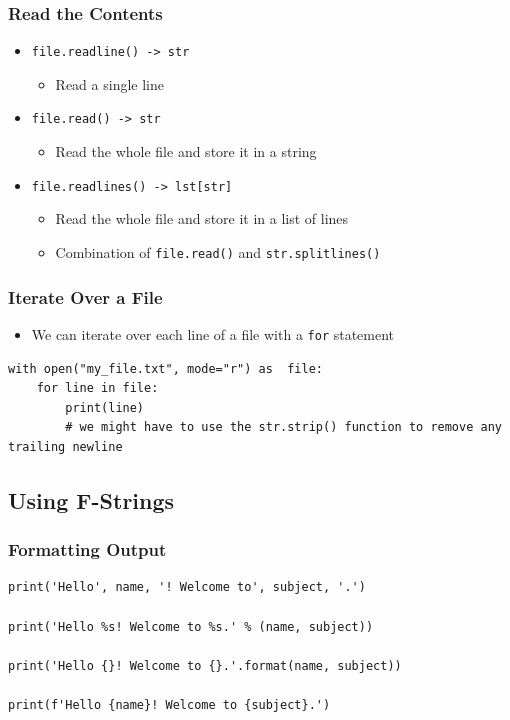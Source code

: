 \documentclass[11pt]{beamer}
\begin{document}
\begin{frame}[fragile]\frametitle{Read the Contents}
\begin{itemize}
\item \lstinline|file.readline() -> str|
    \begin{itemize}
    \item Read a single line
    \end{itemize}
\item \lstinline|file.read() -> str|
    \begin{itemize}
        \item Read the whole file and store it in a string
    \end{itemize}
\item \lstinline|file.readlines() -> lst[str]|
    \begin{itemize}
        \item Read the whole file and store it in a list of lines
        \item Combination of \lstinline|file.read()| and \lstinline|str.splitlines()|
    \end{itemize}
\end{itemize}
\end{frame}


\begin{frame}[fragile]\frametitle{Iterate Over a File}
\begin{itemize}
\item We can iterate over each line of a file with a \lstinline|for| statement
\end{itemize}
\begin{lstlisting}[basicstyle=\small]
with open("my_file.txt", mode="r") as  file:
    for line in file:
        print(line)
        # we might have to use the str.strip() function to remove any trailing newline
\end{lstlisting}
\end{frame}



\subsection{Using F-Strings}

\begin{frame}[fragile]\frametitle{Formatting Output}
\begin{lstlisting}[basicstyle=\small]
print('Hello', name, '! Welcome to', subject, '.')

print('Hello %s! Welcome to %s.' % (name, subject))

print('Hello {}! Welcome to {}.'.format(name, subject))

print(f'Hello {name}! Welcome to {subject}.')
\end{lstlisting}
\end{frame}
\end{document}
